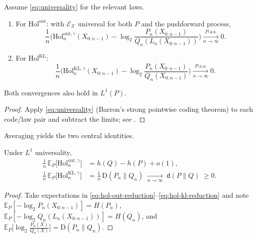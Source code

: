 \documentclass[11pt]{article}
\newcommand{\X}{\mathcal{X}}
\newcommand{\E}{\mathbb{E}}
\newcommand{\1}{\mathbbm{1}}
\newcommand{\KL}{\mathrm{D}}
\newcommand{\code}{\mathcal{E}}
\begin{document}
\begin{lemma}\label{lem:pointwise}
Assume \eqref{eq:universality} for the relevant laws.
\begin{enumerate}[leftmargin=2em,itemsep=0.25em]
\item For $\mathrm{Hol}^{\mathrm{out}}$: with $\code_\X$ universal for both $P$ and the pushforward process,
\begin{equation}\label{eq:hol-out-reduction}
\frac{1}{n}\Big(\mathrm{Hol}_{n}^{\mathrm{out},\gamma}(X_{0:n-1}) - \log_2\frac{P_n(X_{0:n-1})}{Q_n(L_n(X_{0:n-1}))}\Big) \xrightarrow[n\to\infty]{P\text{-a.s.}} 0.
\end{equation}
\item For $\mathrm{Hol}^{\mathrm{KL}}$:
\begin{equation}\label{eq:hol-kl-reduction}
\frac{1}{n}\Big(\mathrm{Hol}_{n}^{\mathrm{KL},\gamma}(X_{0:n-1}) - \log_2\frac{P_n(X_{0:n-1})}{Q_n(X_{0:n-1})}\Big) \xrightarrow[n\to\infty]{P\text{-a.s.}} 0.
\end{equation}
\end{enumerate}
Both convergences also hold in $L^1(P)$.
\end{lemma}
\begin{proof}
Apply \eqref{eq:universality} (Barron's strong pointwise coding theorem) to each code/law pair and subtract the limits; see \cite{barron1985,csiszarshields2004,shields1996}.
\end{proof}

Averaging yields the two central identities.

\begin{theorem}\label{thm:exp_reductions}
Under $L^1$ universality,
\begin{align}
\frac{1}{n}\,\E_P\big[\mathrm{Hol}_{n}^{\mathrm{out},\gamma}\big]
&= h(Q)-h(P)+o(1), \label{eq:exp-out}\\[0.35em]
\frac{1}{n}\,\E_P\big[\mathrm{Hol}_{n}^{\mathrm{KL},\gamma}\big]
&= \frac{1}{n}\,\KL(P_n\|Q_n)\;\xrightarrow[n\to\infty]{}\; \mathsf{d}(P\|Q)\;\ge 0. \label{eq:exp-kl}
\end{align}
\end{theorem}
\begin{proof}
Take expectations in \eqref{eq:hol-out-reduction}--\eqref{eq:hol-kl-reduction} and note
$\E_P[-\log_2 P_n(X_{0:n-1})]=H(P_n)$, $\E_P[-\log_2 Q_n(L_n(X_{0:n-1}))]=H(Q_n)$, and $\E_P\big[\log_2 \tfrac{P_n(X)}{Q_n(X)}\big]=\KL(P_n\|Q_n)$.
\end{proof}
\end{document}
